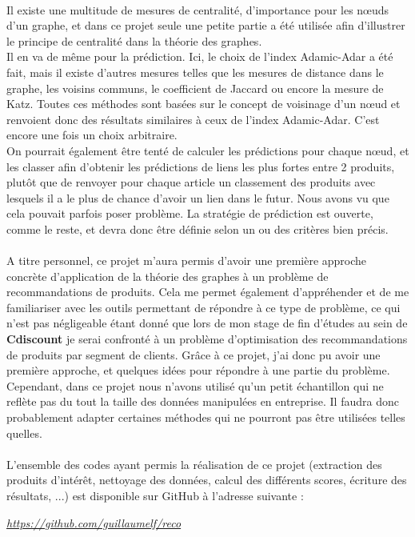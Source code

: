 \documentclass[14pt, openany]{article}
\begin{document}
\paragraph{}
Il existe une multitude de mesures de centralité, d'importance pour les nœuds d'un graphe, et dans ce projet seule une petite partie a été utilisée afin d'illustrer le principe de centralité dans la théorie des graphes.\\
Il en va de même pour la prédiction. Ici, le choix de l'index Adamic-Adar a été fait, mais il existe d'autres mesures telles que les mesures de distance dans le graphe, les voisins communs, le coefficient de Jaccard ou encore la mesure de Katz. Toutes ces méthodes sont basées sur le concept de voisinage d'un nœud et renvoient donc des résultats similaires à ceux de l'index Adamic-Adar. C'est encore une fois un choix arbitraire.\\
On pourrait également être tenté de calculer les prédictions pour chaque nœud, et les classer afin d'obtenir les prédictions de liens les plus fortes entre 2 produits, plutôt que de renvoyer pour chaque article un classement des produits avec lesquels il a le plus de chance d'avoir un lien dans le futur. Nous avons vu que cela pouvait parfois poser problème. La stratégie de prédiction est ouverte, comme le reste, et devra donc être définie selon un ou des critères bien précis.
\paragraph{}
A titre personnel, ce projet m'aura permis d'avoir une première approche concrète d'application de la théorie des graphes à un problème de recommandations de produits. Cela me permet également d'appréhender et de me familiariser avec les outils permettant de répondre à ce type de problème, ce qui n'est pas négligeable étant donné que lors de mon stage de fin d'études au sein de \textbf{Cdiscount} je serai confronté à un problème d'optimisation des recommandations de produits par segment de clients. Grâce à ce projet, j'ai donc pu avoir une première approche, et quelques idées pour répondre à une partie du problème. Cependant, dans ce projet nous n'avons utilisé qu'un petit échantillon qui ne reflète pas du tout la taille des données manipulées en entreprise. Il faudra donc probablement adapter certaines méthodes qui ne pourront pas être utilisées telles quelles.
\paragraph{}
L'ensemble des codes ayant permis la réalisation de ce projet (extraction des produits d'intérêt, nettoyage des données, calcul des différents scores, écriture des résultats, ...) est disponible sur GitHub à l'adresse suivante :
\begin{center}
\textit{\textcolor{blue}{\url{https://github.com/guillaumelf/reco}}}
\end{center}
\end{document}
